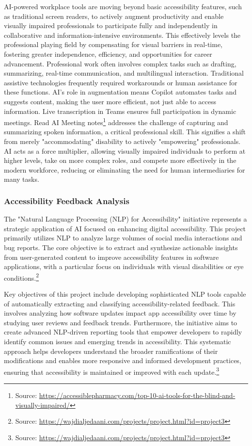 AI-powered workplace tools are moving beyond basic accessibility features, such as traditional screen readers, to actively augment productivity and enable visually impaired professionals to participate fully and independently in collaborative and information-intensive environments. This effectively levels the professional playing field by compensating for visual barriers in real-time, fostering greater independence, efficiency, and opportunities for career advancement. Professional work often involves complex tasks such as drafting, summarizing, real-time communication, and multilingual interaction. Traditional assistive technologies frequently required workarounds or human assistance for these functions. AI's role in augmentation means Copilot automates tasks and suggests content, making the user more efficient, not just able to access information. Live transcription in Teams ensures full participation in dynamic meetings. Read AI Meeting notes\footnote{Source: \url{https://accessiblepharmacy.com/top-10-ai-tools-for-the-blind-and-visually-impaired/}} addresses the challenge of capturing and summarizing spoken information, a critical professional skill. This signifies a shift from merely "accommodating" disability to actively "empowering" professionals. AI acts as a force multiplier, allowing visually impaired individuals to perform at higher levels, take on more complex roles, and compete more effectively in the modern workforce, reducing or eliminating the need for human intermediaries for many tasks.

\subsubsection{Accessibility Feedback Analysis}

The "Natural Language Processing (NLP) for Accessibility" initiative represents a strategic application of AI focused on enhancing digital accessibility. This project primarily utilizes NLP to analyze large volumes of social media interactions and bug reports. The core objective is to extract and synthesize actionable insights from user-generated content to improve accessibility features in software applications, with a particular focus on individuals with visual disabilities or eye conditions.\footnote{Source: \url{https://wajdialjedaani.com/projects/project.html?id=project3}}

Key objectives of this project include developing sophisticated NLP tools capable of automatically extracting and classifying accessibility-related feedback. This involves analyzing how software updates impact app accessibility over time by studying user reviews and feedback trends. Furthermore, the initiative aims to create advanced NLP-driven reporting tools that empower developers to rapidly identify common issues and emerging trends in accessibility. This systematic approach helps developers understand the broader ramifications of their modifications and enables more responsive and informed development practices, ensuring that accessibility is maintained or improved with each update.\footnote{Source: \url{https://wajdialjedaani.com/projects/project.html?id=project3}}

